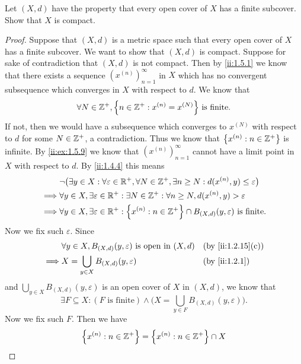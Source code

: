 \begin{ex}\label{ii:ex:1.5.11}
  Let \((X, d)\) have the property that every open cover of \(X\) has a finite subcover.
  Show that \(X\) is compact.
\end{ex}

\begin{proof}
  Suppose that \((X, d)\) is a metric space such that every open cover of \(X\) has a finite subcover.
  We want to show that \((X, d)\) is compact.
  Suppose for sake of contradiction that \((X, d)\) is not compact.
  Then by \cref{ii:1.5.1} we know that there exists a sequence \((x^{(n)})_{n = 1}^\infty\) in \(X\) which has no convergent subsequence which converges in \(X\) with respect to \(d\).
  We know that
  \[
    \forall N \in \Z^+, \set{n \in \Z^+ : x^{(n)} = x^{(N)}} \text{ is finite}.
  \]
  If not, then we would have a subsequence which converges to \(x^{(N)}\) with respect to \(d\) for some \(N \in \mathbb{Z}^+\), a contradiction.
  Thus we know that \(\left\lbrace x^{(n)} : n \in \mathbb{Z}^+\right\rbrace\) is infinite.
  By \cref{ii:ex:1.5.9} we know that \((x^{(n)})_{n = 1}^\infty\) cannot have a limit point in \(X\) with respect to \(d\).
  By \cref{ii:1.4.4} this means
  \begin{align*}
             & \lnot\big(\exists y \in X : \forall \varepsilon \in \mathbb{R}^+, \forall N \in \mathbb{Z}^+, \exists n \geq N : d(x^{(n)}, y) \leq \varepsilon\big) \\
    \implies & \forall y \in X, \exists \varepsilon \in \mathbb{R}^+ : \exists N \in \mathbb{Z}^+ : \forall n \geq N, d(x^{(n)}, y) > \varepsilon                   \\
    \implies & \forall y \in X, \exists \varepsilon \in \mathbb{R}^+ : \left\lbrace x^{(n)} : n \in \mathbb{Z}^+\right\rbrace \cap B_{(X, d)}(y, \varepsilon) \text{ is finite}.
  \end{align*}
  Now we fix such \(\varepsilon\).
  Since
  \begin{align*}
             & \forall y \in X, B_{(X, d)}(y, \varepsilon) \text{ is open in } (X, d) &  & \by{ii:1.2.15}[c] \\
    \implies & X = \bigcup_{y \in X} B_{(X, d)}(y, \varepsilon)                       &  & \by{ii:1.2.1}
  \end{align*}
  and \(\bigcup_{y \in X} B_{(X, d)}(y, \varepsilon)\) is an open cover of \(X\) in \((X, d)\), we know that
  \[
    \exists F \subseteq X : (F \text{ is finite}) \land \bigg(X = \bigcup_{y \in F} B_{(X, d)}(y, \varepsilon)\bigg).
  \]
  Now we fix such \(F\).
  Then we have
  \begin{align*}
    \set{x^{(n)} : n \in \Z^+} & = \set{x^{(n)} : n \in \Z^+} \cap X                                                        \\

\end{align*}
\end{proof}
